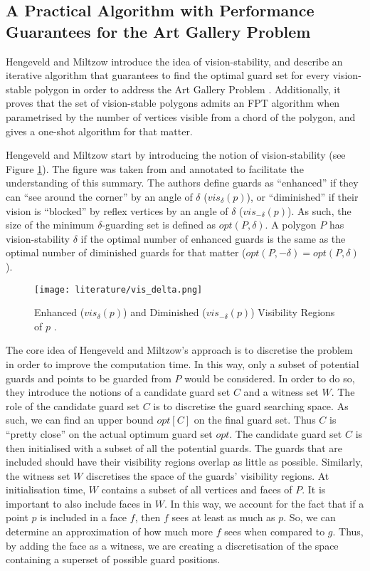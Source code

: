 \subsection[An Algorithm with Performance Guarantees]{A Practical Algorithm with Performance Guarantees for the Art Gallery Problem}
Hengeveld and Miltzow \cite{DBLP:journals/corr/abs-2007-06920} introduce the idea of vision-stability, and describe an iterative algorithm that guarantees to find the optimal guard set for every vision-stable polygon in order to address the Art Gallery Problem \cite{o1987art}. Additionally, it proves that the set of vision-stable polygons admits an FPT algorithm when parametrised by the number of vertices visible from a chord of the polygon, and gives a one-shot algorithm for that matter.

Hengeveld and Miltzow \cite{DBLP:journals/corr/abs-2007-06920} start by introducing the notion of vision-stability (see Figure \ref{fig:vis}). The figure was taken from \cite{DBLP:journals/corr/abs-2007-06920} and annotated to facilitate the understanding of this summary. The authors define guards as ``enhanced'' if they can ``see around the corner'' by an angle of $\delta$ ($vis_\delta(p)$), or ``diminished'' if their vision is ``blocked'' by reflex vertices by an angle of $\delta$ ($vis_{-\delta}(p)$). As such, the size of the minimum $\delta$-guarding set is defined as $opt(P, \delta)$. A polygon $P$ has vision-stability $\delta$ if the optimal number of enhanced guards is the same as the optimal number of diminished guards for that matter ($opt(P, -\delta) = opt(P, \delta)$). 

\begin{figure}[h!]
    \centering
    \texttt{[image: literature/vis\_delta.png]}
    \caption{Enhanced ($vis_\delta(p)$) and Diminished ($vis_{-\delta}(p)$) Visibility Regions of $p$ \cite{DBLP:journals/corr/abs-2007-06920}.}
    \label{fig:vis}
\end{figure}

The core idea of Hengeveld and Miltzow's approach is to discretise the problem in order to improve the computation time. In this way, only a subset of potential guards and points to be guarded from $P$ would be considered. In order to do so, they introduce the notions of a candidate guard set $C$ and a witness set $W$. The role of the candidate guard set $C$ is to discretise the guard searching space. As such, we can find an upper bound $opt[C]$ on the final guard set. Thus $C$ is ``pretty close'' on the actual optimum guard set $opt$. The candidate guard set $C$ is then initialised with a subset of all the potential guards. The guards that are included should have their visibility regions overlap as little as possible. Similarly, the witness set $W$ discretises the space of the guards' visibility regions. At initialisation time, $W$ contains a subset of all vertices and faces of $P$. It is important to also include faces in $W$. In this way, we account for the fact that if a point $p$ is included in a face $f$, then $f$ sees at least as much as $p$. So, we can determine an approximation of how much more $f$ sees when compared to $g$. Thus, by adding the face as a witness, we are creating a discretisation of the space containing a superset of possible guard positions.

